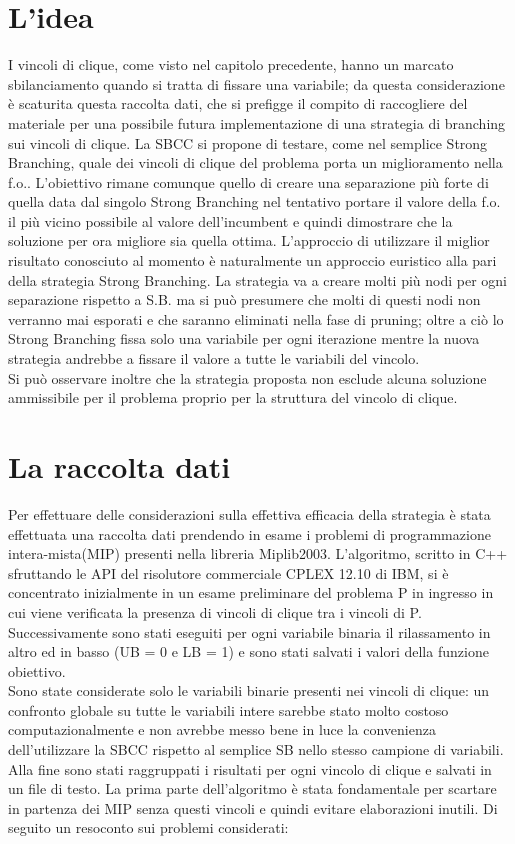 \documentclass[12pt,a4paper,twoside,openright]{book}
\begin{document}
\section{L'idea}
I vincoli di clique, come visto nel capitolo precedente, hanno un marcato sbilanciamento quando si 
tratta di fissare una variabile; da questa considerazione è scaturita questa raccolta dati, 
che si prefigge il compito di raccogliere del materiale per una possibile futura implementazione di una 
strategia di branching sui vincoli di clique. La SBCC si propone di testare, come nel semplice Strong Branching,
quale dei vincoli di clique del problema porta un miglioramento nella f.o.. 
L'obiettivo rimane comunque quello di creare una separazione più forte di quella data dal singolo Strong Branching 
nel tentativo portare il valore della f.o. il più vicino possibile al valore dell'incumbent e quindi dimostrare
che la soluzione per ora migliore sia quella ottima.
L'approccio di utilizzare il miglior risultato conosciuto al momento è naturalmente un approccio
euristico alla pari della strategia Strong Branching.
La strategia va a creare molti più nodi per ogni separazione rispetto a S.B. ma si può presumere che 
molti di questi nodi non verranno mai esporati e che saranno eliminati nella fase di pruning; oltre a ciò
lo Strong Branching fissa solo una variabile per ogni iterazione mentre la nuova strategia andrebbe a fissare 
il valore a tutte le variabili del vincolo. \\
Si può osservare inoltre che la strategia proposta non esclude alcuna soluzione ammissibile per il
problema proprio per la struttura del vincolo di clique.

\section{La raccolta dati}
Per effettuare delle considerazioni sulla effettiva efficacia della strategia è stata effettuata 
una raccolta dati prendendo in esame i problemi di programmazione intera-mista(MIP) presenti
nella libreria Miplib2003. L’algoritmo, scritto in C++ sfruttando le API del risolutore 
commerciale CPLEX 12.10 di IBM, si è concentrato inizialmente in un esame preliminare del 
problema P in ingresso in cui viene verificata la presenza di vincoli di clique tra i vincoli di P. 
Successivamente sono stati eseguiti per ogni variabile binaria il rilassamento in altro ed in basso 
(UB  = 0 e LB = 1) e sono stati salvati i valori della funzione obiettivo. \\
Sono state considerate solo le variabili binarie presenti nei vincoli di clique: un confronto globale
su tutte le variabili intere sarebbe stato molto costoso computazionalmente e non avrebbe messo bene 
in luce la convenienza dell'utilizzare la SBCC rispetto al semplice SB nello stesso campione di variabili.\\
Alla fine sono stati raggruppati i risultati per ogni vincolo di clique e salvati in un file di testo. 
La prima parte dell’algoritmo è stata fondamentale per scartare in partenza dei MIP senza 
questi vincoli e quindi evitare elaborazioni inutili.
\clearpage
\pagebreak 
Di seguito un resoconto sui problemi considerati:
\end{document}
